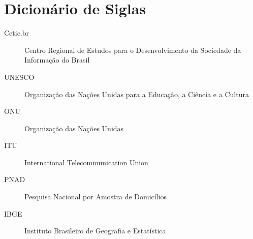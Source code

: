 \section*{Dicionário de Siglas}

\begin{description}
    \item[Cetic.br] Centro Regional de Estudos para o Desenvolvimento da Sociedade da Informação do Brasil
    \item[UNESCO] Organização das Nações Unidas para a Educação, a Ciência e a Cultura
    \item[ONU] Organização das Nações Unidas
    \item[ITU] International Telecommunication Union
    \item[PNAD] Pesquisa Nacional por Amostra de Domicílios
    \item[IBGE] Instituto Brasileiro de Geografia e Estatística
\end{description}